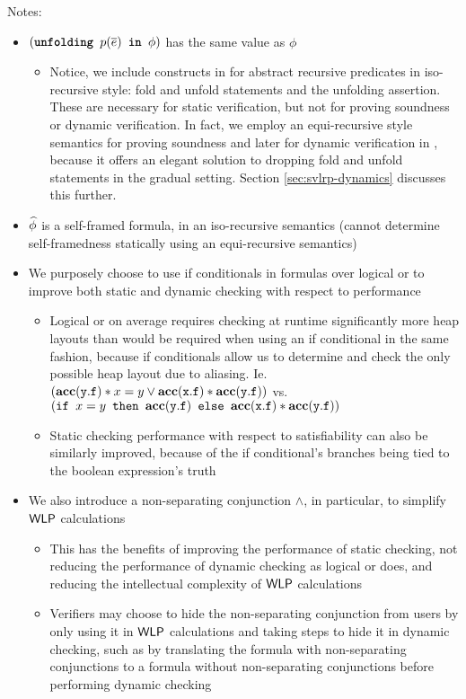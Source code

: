 \documentclass {llncs}
\begin{document}
\noindent Notes:
\begin{itemize}
\item $(\textup{\texttt{\textbf{unfolding }}}{p(\overline{e})}\textup{\texttt{\textbf{ in }}}{\phi})$ has the same value as $\phi$
	\begin{itemize}
	\item Notice, we include constructs in \svlrp for abstract recursive predicates in iso-recursive style: fold and unfold statements and the unfolding assertion. These are necessary for static verification, but not for proving soundness or dynamic verification. In fact, we employ an equi-recursive style semantics for proving soundness and later for dynamic verification in \gvlrp, because it offers an elegant solution to dropping fold and unfold statements in the gradual setting. Section \ref{sec:svlrp-dynamics} discusses this further.
	\end{itemize}
\item $\widehat{\phi}$ is a self-framed formula, in an iso-recursive semantics (cannot determine self-framedness statically using an equi-recursive semantics)
\item We purposely choose to use if conditionals in formulas over logical or to improve both static and dynamic checking with respect to performance
	\begin{itemize}
	\item Logical or on average requires checking at runtime significantly more heap layouts than would be required when using an if conditional in the same fashion, because if conditionals allow us to determine and check the only possible heap layout due to aliasing. Ie. $\left( \mathtt{\textbf{acc}(y.f)} \ast x = y \vee \mathtt{\textbf{acc}(x.f)} \ast \mathtt{\textbf{acc}(y.f)} \right)$ vs. \\ $(\textup{\texttt{if }}{x=y}\textup{\texttt{ then }}{\mathtt{\textbf{acc}(y.f)}}\textup{\texttt{ else }}{\mathtt{\textbf{acc}(x.f)} \ast \mathtt{\textbf{acc}(y.f)}})$
	\item Static checking performance with respect to satisfiability can also be similarly improved, because of the if conditional's branches being tied to the boolean expression's truth
	\end{itemize}
\item We also introduce a non-separating conjunction $\wedge$, in particular, to simplify $\textup{\textmd{\textsf{WLP}}}$ calculations
	\begin{itemize}
	\item This has the benefits of improving the performance of static checking, not reducing the performance of dynamic checking as logical or does, and reducing the intellectual complexity of $\textup{\textmd{\textsf{WLP}}}$ calculations
	\item Verifiers may choose to hide the non-separating conjunction from users by only using it in $\textup{\textmd{\textsf{WLP}}}$ calculations and taking steps to hide it in dynamic checking, such as by translating the formula with non-separating conjunctions to a formula without non-separating conjunctions before performing dynamic checking
	\end{itemize}
\end{itemize}
\end{document}
